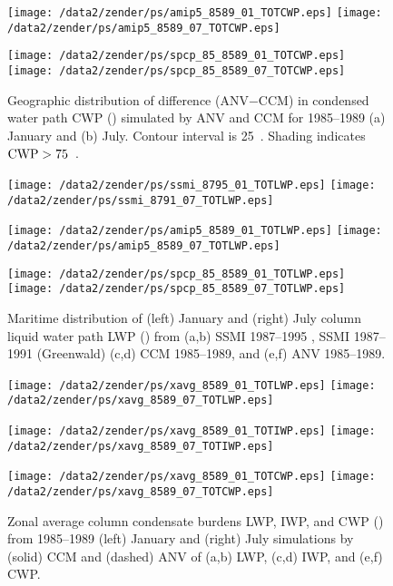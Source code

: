 \documentclass[twocolumn,final]{article}
\begin{document}
\begin{figure*}
\begin{center}
\texttt{[image: /data2/zender/ps/amip5\_8589\_01\_TOTCWP.eps]}%
\texttt{[image: /data2/zender/ps/amip5\_8589\_07\_TOTCWP.eps]}%

\texttt{[image: /data2/zender/ps/spcp\_85\_8589\_01\_TOTCWP.eps]}%
\texttt{[image: /data2/zender/ps/spcp\_85\_8589\_07\_TOTCWP.eps]}%
\end{center}
\caption[Geographic distribution of difference (ANV$-$CCM) in
simulated condensed water path between ANV and CCM for January and
July 1985--1989]{ 
Geographic distribution of difference (ANV$-$CCM) in condensed water
path CWP (\gxmS) simulated by ANV and CCM for 1985--1989 (a) January
and (b) July.
Contour interval is 25~\gxmS. 
Shading indicates $\mbox{\textrm{CWP}} > 75$~\gxmS.
\label{fig:8589_TOTCWP}}   
\end{figure*}
\clearpage

\begin{figure*}
\begin{center}
\texttt{[image: /data2/zender/ps/ssmi\_8795\_01\_TOTLWP.eps]}%
\texttt{[image: /data2/zender/ps/ssmi\_8791\_07\_TOTLWP.eps]}%

\texttt{[image: /data2/zender/ps/amip5\_8589\_01\_TOTLWP.eps]}%
\texttt{[image: /data2/zender/ps/amip5\_8589\_07\_TOTLWP.eps]}%

\texttt{[image: /data2/zender/ps/spcp\_85\_8589\_01\_TOTLWP.eps]}%
\texttt{[image: /data2/zender/ps/spcp\_85\_8589\_07\_TOTLWP.eps]}%
\end{center}
\caption[Geographic distribution of January and July column liquid
water path LWP from 1987--1995 SSMI, and 1985--1989 CCM and
ANV]{ 
Maritime distribution of (left) January and (right) July
column liquid water path LWP (\gxmS) from (a,b) SSMI 1987--1995
\cite[]{WeG94}, SSMI 1987--1991 (Greenwald) (c,d) CCM 1985--1989, and
(e,f) ANV 1985--1989.  
\label{fig:8589_TOTLWP}}
\end{figure*}
\clearpage

\begin{figure*}
\begin{center}
\texttt{[image: /data2/zender/ps/xavg\_8589\_01\_TOTLWP.eps]}%
\texttt{[image: /data2/zender/ps/xavg\_8589\_07\_TOTLWP.eps]}%

\texttt{[image: /data2/zender/ps/xavg\_8589\_01\_TOTIWP.eps]}%
\texttt{[image: /data2/zender/ps/xavg\_8589\_07\_TOTIWP.eps]}%

\texttt{[image: /data2/zender/ps/xavg\_8589\_01\_TOTCWP.eps]}%
\texttt{[image: /data2/zender/ps/xavg\_8589\_07\_TOTCWP.eps]}%
\end{center}
\caption[Zonal average column condensate burdens LWP, IWP, and CWP
from 1985--1989 January and July simulations by CCM and ANV]{ 
Zonal average column condensate burdens LWP, IWP, and CWP (\gxmS) from
1985--1989 (left) January and (right) July simulations by (solid) CCM
and (dashed) ANV of (a,b) LWP, (c,d) IWP, and (e,f) CWP.   
\label{fig:xavg_8589_CP}}   
\end{figure*}
\clearpage
\end{document}
